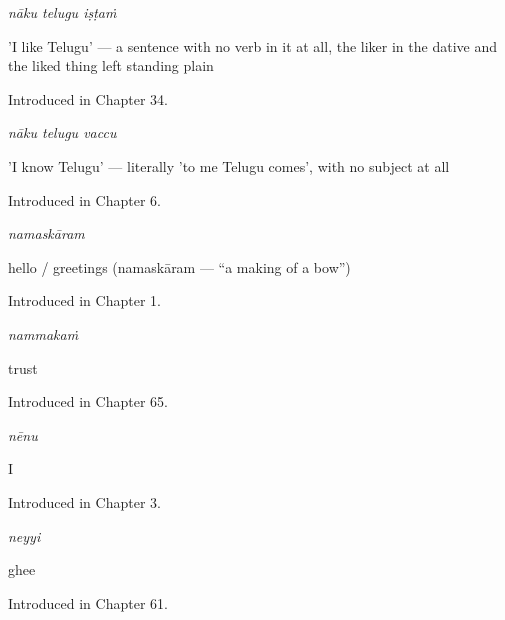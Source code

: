 \noindent\begin{minipage}[t]{\linewidth}
\raggedright
\textbf{  }\enspace\emph{nāku telugu iṣṭaṁ}\par
\small 'I like Telugu' — a sentence with no verb in it at all, the liker in the dative and the liked thing left standing plain\par
\footnotesize Introduced in Chapter 34.
\end{minipage}\par\medskip

\noindent\begin{minipage}[t]{\linewidth}
\raggedright
\textbf{  }\enspace\emph{nāku telugu vaccu}\par
\small 'I know Telugu' — literally 'to me Telugu comes', with no subject at all\par
\footnotesize Introduced in Chapter 6.
\end{minipage}\par\medskip

\noindent\begin{minipage}[t]{\linewidth}
\raggedright
\textbf{}\enspace\emph{namaskāram}\par
\small hello / greetings (namaskāram — \textquotedblleft{}a making of a bow\textquotedblright{})\par
\footnotesize Introduced in Chapter 1.
\end{minipage}\par\medskip

\noindent\begin{minipage}[t]{\linewidth}
\raggedright
\textbf{}\enspace\emph{nammakaṁ}\par
\small trust\par
\footnotesize Introduced in Chapter 65.
\end{minipage}\par\medskip

\noindent\begin{minipage}[t]{\linewidth}
\raggedright
\textbf{}\enspace\emph{nēnu}\par
\small I\par
\footnotesize Introduced in Chapter 3.
\end{minipage}\par\medskip

\noindent\begin{minipage}[t]{\linewidth}
\raggedright
\textbf{}\enspace\emph{neyyi}\par
\small ghee\par
\footnotesize Introduced in Chapter 61.
\end{minipage}\par\medskip

